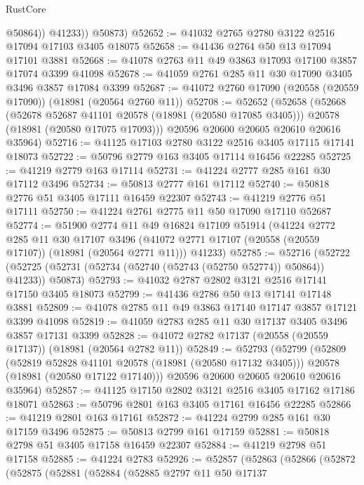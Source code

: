 \begin{lexlean}{RustCore}
\begin{coremodule}
              @50864))
          @41233))
      @50873)
@52652 := @41032 @2765 @2780 @3122 @2516 @17094 @17103 @3405 @18075
@52658 := @41436 @2764 @50 @13 @17094 @17101 @3881
@52668 := @41078 @2763 @11 @49 @3863 @17093 @17100 @3857 @17074 @3399 @41098
@52678 := @41059 @2761 @285 @11 @30 @17090 @3405 @3496 @3857 @17084 @3399
@52687 := @41072 @2760 @17090 (@20558 (@20559 @17090)) (@18981 (@20564 @2760 @11))
@52708 := @52652
    (@52658
      (@52668
        (@52678 @52687 @41101 @20578 (@18981 (@20580 @17085 @3405)))
        @20578
        (@18981 (@20580 @17075 @17093)))
      @20596
      @20600
      @20605
      @20610
      @20616
      @35964)
@52716 := @41125 @17103 @2780 @3122 @2516 @3405 @17115 @17141 @18073
@52722 := @50796 @2779 @163 @3405 @17114 @16456 @22285
@52725 := @41219 @2779 @163 @17114
@52731 := @41224 @2777 @285 @161 @30 @17112 @3496
@52734 := @50813 @2777 @161 @17112
@52740 := @50818 @2776 @51 @3405 @17111 @16459 @22307
@52743 := @41219 @2776 @51 @17111
@52750 := @41224 @2761 @2775 @11 @50 @17090 @17110 @52687
@52774 := @51900
    @2774
    @11
    @49
    @16824
    @17109
    @51914
    (@41224
      @2772
      @285
      @11
      @30
      @17107
      @3496
      (@41072 @2771 @17107 (@20558 (@20559 @17107)) (@18981 (@20564 @2771 @11)))
      @41233)
@52785 := @52716
    (@52722 (@52725 (@52731 (@52734 (@52740 (@52743 (@52750 @52774)) @50864)) @41233)) @50873)
@52793 := @41032 @2787 @2802 @3121 @2516 @17141 @17150 @3405 @18073
@52799 := @41436 @2786 @50 @13 @17141 @17148 @3881
@52809 := @41078 @2785 @11 @49 @3863 @17140 @17147 @3857 @17121 @3399 @41098
@52819 := @41059 @2783 @285 @11 @30 @17137 @3405 @3496 @3857 @17131 @3399
@52828 := @41072 @2782 @17137 (@20558 (@20559 @17137)) (@18981 (@20564 @2782 @11))
@52849 := @52793
    (@52799
      (@52809
        (@52819 @52828 @41101 @20578 (@18981 (@20580 @17132 @3405)))
        @20578
        (@18981 (@20580 @17122 @17140)))
      @20596
      @20600
      @20605
      @20610
      @20616
      @35964)
@52857 := @41125 @17150 @2802 @3121 @2516 @3405 @17162 @17186 @18071
@52863 := @50796 @2801 @163 @3405 @17161 @16456 @22285
@52866 := @41219 @2801 @163 @17161
@52872 := @41224 @2799 @285 @161 @30 @17159 @3496
@52875 := @50813 @2799 @161 @17159
@52881 := @50818 @2798 @51 @3405 @17158 @16459 @22307
@52884 := @41219 @2798 @51 @17158
@52885 := @41224 @2783
@52926 := @52857
    (@52863
      (@52866
        (@52872
          (@52875
            (@52881
              (@52884
                (@52885
                  @2797
                  @11
                  @50
                  @17137

\end{coremodule}
\end{lexlean}
